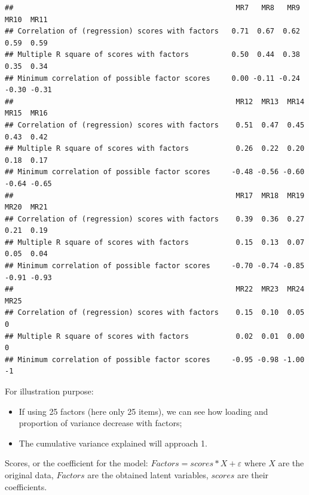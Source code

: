 \documentclass[
]{ctexart}
\newenvironment{Shaded}{\begin{snugshade}}{\end{snugshade}}
\newcommand{\FunctionTok}[1]{\textcolor[rgb]{0.13,0.29,0.53}{\textbf{#1}}}
\newcommand{\NormalTok}[1]{#1}
\newcommand{\SpecialCharTok}[1]{\textcolor[rgb]{0.81,0.36,0.00}{\textbf{#1}}}
\providecommand{\tightlist}{%
  \setlength{\itemsep}{0pt}\setlength{\parskip}{0pt}}
\begin{document}
\begin{verbatim}
##                                                    MR7   MR8   MR9  MR10  MR11
## Correlation of (regression) scores with factors   0.71  0.67  0.62  0.59  0.59
## Multiple R square of scores with factors          0.50  0.44  0.38  0.35  0.34
## Minimum correlation of possible factor scores     0.00 -0.11 -0.24 -0.30 -0.31
##                                                    MR12  MR13  MR14  MR15  MR16
## Correlation of (regression) scores with factors    0.51  0.47  0.45  0.43  0.42
## Multiple R square of scores with factors           0.26  0.22  0.20  0.18  0.17
## Minimum correlation of possible factor scores     -0.48 -0.56 -0.60 -0.64 -0.65
##                                                    MR17  MR18  MR19  MR20  MR21
## Correlation of (regression) scores with factors    0.39  0.36  0.27  0.21  0.19
## Multiple R square of scores with factors           0.15  0.13  0.07  0.05  0.04
## Minimum correlation of possible factor scores     -0.70 -0.74 -0.85 -0.91 -0.93
##                                                    MR22  MR23  MR24 MR25
## Correlation of (regression) scores with factors    0.15  0.10  0.05    0
## Multiple R square of scores with factors           0.02  0.01  0.00    0
## Minimum correlation of possible factor scores     -0.95 -0.98 -1.00   -1
\end{verbatim}

For illustration purpose:

\begin{itemize}
\tightlist
\item
  If using 25 factors (here only 25 items), we can see how loading and
  proportion of variance decrease with factors;
\item
  The cumulative variance explained will approach 1.
\end{itemize}

Scores, or the coefficient for the model:
\(Factors = scores*X+\varepsilon\) where \(X\) are the original data,
\(Factors\) are the obtained latent variables, \(scores\) are their
coefficients.

\begin{Shaded}
\end{Shaded}
\end{document}

